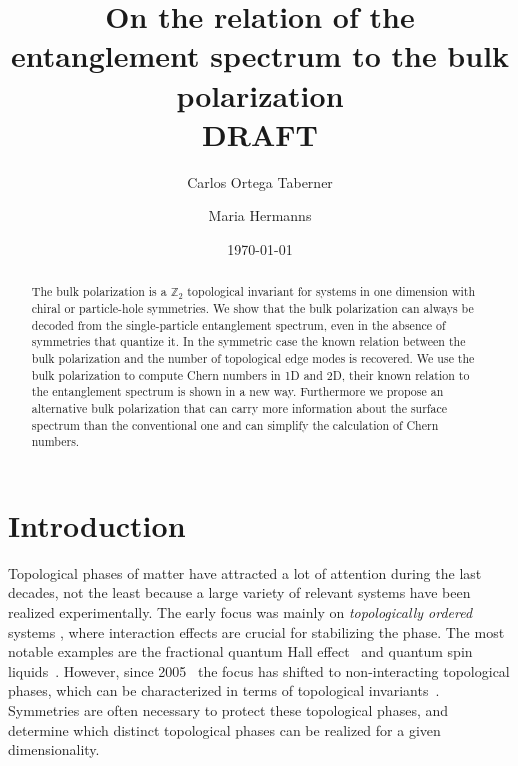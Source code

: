 \documentclass[twocolumn,amsmath,longbibliography,amssymb,superscriptaddress]{revtex4-1}
\begin{document}
		
\title{On the relation of the entanglement spectrum to the bulk polarization \\ DRAFT}
\author{Carlos Ortega Taberner}

\author{Maria Hermanns}
\date{\today}
\begin{abstract}
The bulk polarization is a $\mathbb{Z}_2$ topological invariant for systems in one dimension with chiral or particle-hole symmetries. We show that the bulk polarization can always be decoded from the single-particle entanglement spectrum, even in the absence of symmetries that quantize it. In the symmetric case the known relation between the bulk polarization and the number of topological edge modes is recovered. We use the bulk polarization to compute Chern numbers in 1D and 2D, their known relation to the entanglement spectrum is shown in a new way. Furthermore we propose an alternative bulk polarization that can carry more information about the surface spectrum than the conventional one and can simplify the calculation of Chern numbers. 
\end{abstract}

\maketitle
	


\section{Introduction}
Topological phases of matter have attracted a lot of attention during the last decades, not the least because a large variety of relevant systems have been realized experimentally. 
The early focus was mainly on \emph{topologically ordered} systems \cite{wenbook}, where interaction effects are crucial for stabilizing the phase. 
The most notable examples are the fractional quantum Hall effect~\cite{Tsui1982} and quantum spin liquids~\cite{Balents2010spin}. 
However, since 2005~\cite{kane2005quantum, roy2009topological} the focus has shifted to non-interacting topological phases, which can be characterized in terms of topological invariants~\cite{ryu2010topological}. 
Symmetries are often necessary to protect these topological phases, and determine which distinct topological phases can be realized for a given dimensionality. 
\end{document}
